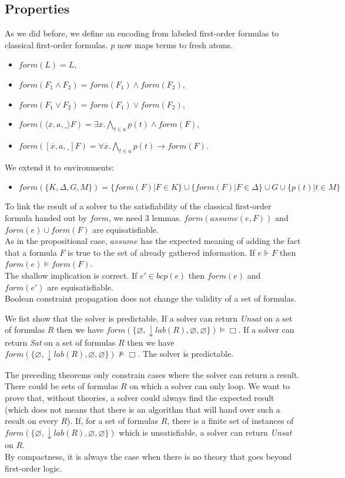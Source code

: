 \documentclass[a4paper,11pt]{article}
\newcommand{\F}{\mathit{form}}
\newcommand{\T}{\mathit{lab}}
\newcommand{\A}{\mathit{assume}}
\newcommand{\B}{\mathit{bcp}}
\begin{document}
\subsection{Properties}
As we did before, we define an encoding from labeled first-order formulas to classical
first-order formulas. $p$ now maps terms to fresh atoms.
\begin{itemize}
 \item $\F(L)=L$,
 \item $\F(F_1\wedge F_2)=\F(F_1)\wedge\F(F_2)$,
 \item $\F(F_1\vee F_2)=\F(F_1)\vee\F(F_2)$,
 \item $\F(\langle\overline x,a,\_\rangle F)=\exists\overline x.\bigwedge_{t\in a} p(t)\wedge\F(F)$,
 \item $\F([\overline x,a,\_]F)=\forall \overline x.\bigwedge_{t\in a} p(t)\rightarrow\F(F)$.
\end{itemize}
We extend it to environments:
\begin{itemize}
 \item $\F(\{K,\Delta,G,M\})=\{\F(F)|F\in K\}\cup\{\F(F)|F\in\Delta\}\cup G\cup\{p(t)|t\in M\}$
\end{itemize}
To link the result of a solver to the satisfiability of the classical first-order formula handed out
by $\F$, we need 3 lemmas.
{\lemma $\F(\A(e,F))$ and $\F(e)\cup\F(F)$ are equisatisfiable.}\\
As in the propositional case, $\A$ has the expected meaning of adding the fact that a formula $F$
is true to the set of already gathered information.
{\lemma If $e\Vdash F$ then $\F(e)\vDash\F(F)$.}\\
The shallow implication is correct.
{\lemma If $e'\in\B(e)$ then $\F(e)$ and $\F(e')$ are equisatisfiable.}\\
Boolean constraint propagation does not change the validity of a set of formulas.

We fist show that the solver is predictable.
{\theorem If a solver can return \emph{Unsat} on a set of formulas $R$ then we have
$\F(\{\varnothing,\downarrow\T(R),\varnothing,\varnothing\})\vDash\Box$.}
{\theorem If a solver can return \emph{Sat} on a set of formulas $R$ then we have
$\F(\{\varnothing,\downarrow\T(R),\varnothing,\varnothing\})\nvDash\Box$.}
{\corollary The solver is predictable.}

The preceding theorems only constrain cases where the solver can return a result.
There could be sets of formulas $R$ on which a solver can only loop. We want to prove that, without
theories, a solver could always find the expected result (which does not means that there is an algorithm
that will hand over such a result on every $R$).
{\theorem If, for a set of formulas $R$, there is a finite set of instances of
$\F(\{\varnothing,\downarrow\T(R),\varnothing,\varnothing\})$ which is unsatisfiable,
a solver can return \emph{Unsat} on $R$.}\\
By compactness, it is always the case when there is no theory that goes
beyond first-order logic.
\end{document}
